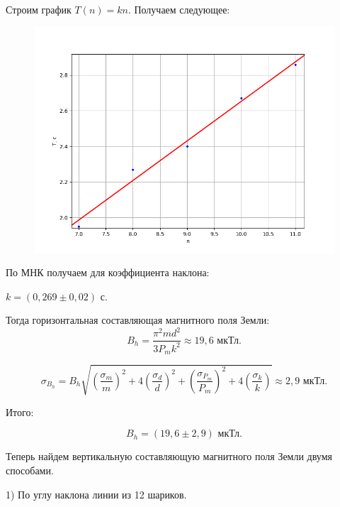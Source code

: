 \documentclass[a4paper,12pt]{article} %
\begin{document}
Строим график $T(n) = kn$. Получаем следующее:

\begin{figure}[h!]
	\centering
	\includegraphics[scale=0.8]{Pictures/T(n).png}
\end{figure}

По МНК получаем для коэффициента наклона:

$k = (0,269 \pm 0,02)$ с.

Тогда горизонтальная составляющая магнитного поля Земли:
\begin{equation*}
	B_h = \frac{\pi ^2 md^2}{3P_m k^2} \approx 19,6 \text{ мкТл}.
\end{equation*}

\begin{equation*}
	\sigma_{B_h} = B_h \sqrt{\left(\frac{\sigma_m}{m}\right)^2 + 4\left(\frac{\sigma_d}{d}\right)^2 + \left(\frac{\sigma_{P_m}}{P_m}\right)^2 + 4 \left(\frac{\sigma_k}{k}\right)} \approx 2,9 \text{ мкТл}.
\end{equation*}

Итого:

\begin{equation*}
	B_h = (19,6 \pm 2,9) \text{ мкТл}.
\end{equation*}

\newpage

Теперь найдем вертикальную составляющую магнитного поля Земли двумя способами.

1) По углу наклона линии из 12 шариков.
\end{document}
